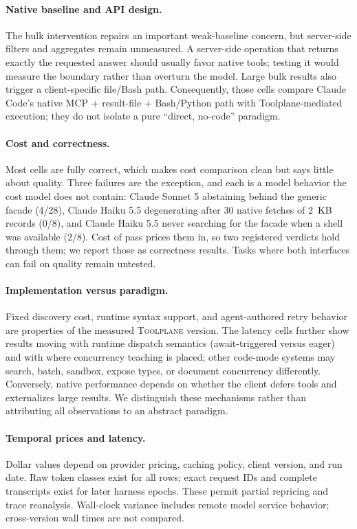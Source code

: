 \documentclass[10pt,twocolumn]{article}
\newcommand{\toolplane}{\textsc{Toolplane}\xspace}
\begin{document}
\paragraph{Native baseline and API design.}
The bulk intervention repairs an important weak-baseline concern, but
server-side filters and aggregates remain unmeasured.  A server-side operation
that returns exactly the requested answer should usually favor native tools;
testing it would measure the boundary rather than overturn the model.  Large
bulk results also trigger a client-specific file/Bash path.  Consequently,
those cells compare Claude Code's native MCP + result-file + Bash/Python path
with Toolplane-mediated execution; they do not isolate a pure ``direct,
no-code'' paradigm.

\paragraph{Cost and correctness.}
Most cells are fully correct, which makes cost comparison clean but says little
about quality.  Three failures are the exception, and each is a model behavior
the cost model does not contain: Claude Sonnet 5 abstaining behind the generic
facade (4/28), Claude Haiku 5.5 degenerating after 30 native fetches of 2~KB
records (0/8), and Claude Haiku 5.5 never searching for the facade when a shell
was available (2/8).  Cost of pass prices them in, so two registered verdicts
hold through them; we report those as correctness results.  Tasks where both
interfaces can fail on quality remain untested.

\paragraph{Implementation versus paradigm.}
Fixed discovery cost, runtime syntax support, and agent-authored retry behavior
are properties of the measured \toolplane version.  The latency cells further
show results moving with runtime dispatch semantics (await-triggered versus eager)
and with where concurrency teaching is placed; other code-mode systems may
search, batch, sandbox, expose types, or document concurrency differently.
Conversely, native performance depends on whether the client defers tools and
externalizes large results.  We distinguish these mechanisms rather than
attributing all observations to an abstract paradigm.

\paragraph{Temporal prices and latency.}
Dollar values depend on provider pricing, caching policy, client version, and
run date.  Raw token classes exist for all rows; exact request IDs and complete
transcripts exist for later harness epochs.  These permit partial repricing and
trace reanalysis.  Wall-clock variance includes remote model service behavior;
cross-version wall times are not compared.
\end{document}
